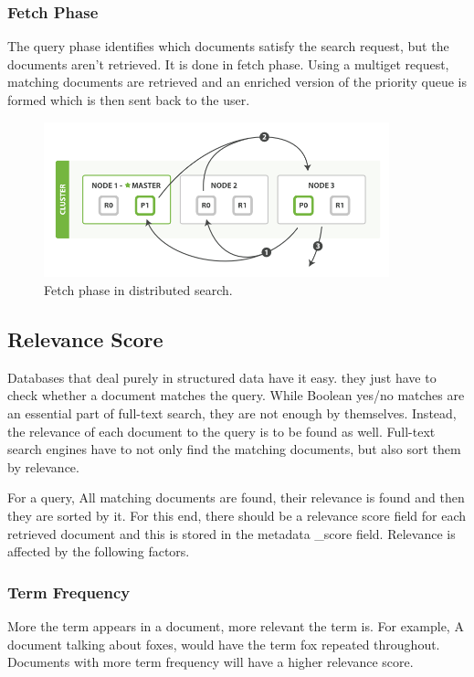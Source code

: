\documentclass[12pt]{article}
\begin{document}
			\subsubsection{Fetch Phase}
			The query phase identifies which documents satisfy the search request, but the documents aren't retrieved. It is done in fetch phase. Using a multiget request, matching documents are retrieved and an enriched version of the priority queue is formed which is then sent back to the user.
				\begin{figure}[ht]
					\centering\includegraphics[width=10cm]{images/fetch_phase}
					\caption{Fetch phase in distributed search.}
				\end{figure}

		\subsection{Relevance Score}
			Databases that deal purely in structured data have it easy. they just have to check whether a document matches the query. While Boolean yes/no matches are an essential part of full-text search, they are not enough by themselves. Instead, the relevance of each document to the query is to be found as well. Full-text search engines have to not only find the matching documents, but also sort them by relevance.

			For a query, All matching documents are found, their relevance is found and then they are sorted by it. For this end, there should be a relevance score field for each retrieved document and this is stored in the metadata \_score field. Relevance is affected by the following factors.

			\subsubsection{Term Frequency}
				More the term appears in a document, more relevant the term is. For example, A document talking about foxes, would have the term fox repeated throughout. Documents with more term frequency will have a higher relevance score.
\end{document}
